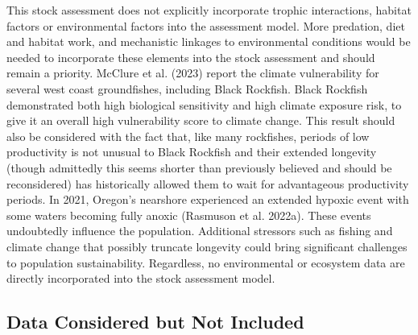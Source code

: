 \documentclass[11pt,
  english,
  letterpaper,
]{article}
\begin{document}
This stock assessment does not explicitly incorporate trophic interactions, habitat factors or environmental factors into the assessment model. More predation, diet and habitat work, and mechanistic linkages to environmental conditions would be needed to incorporate these elements into the stock assessment and should remain a priority. McClure et al. (2023) report the climate vulnerability for several west coast groundfishes, including Black Rockfish. Black Rockfish demonstrated both high biological sensitivity and high climate exposure risk, to give it an overall high vulnerability score to climate change. This result should also be considered with the fact that, like many rockfishes, periods of low productivity is not unusual to Black Rockfish and their extended longevity (though admittedly this seems shorter than previously believed and should be reconsidered) has historically allowed them to wait for advantageous productivity periods. In 2021, Oregon's nearshore experienced an extended hypoxic event with some waters becoming fully anoxic (Rasmuson et al. 2022a). These events undoubtedly influence the population. Additional stressors such as fishing and climate change that possibly truncate longevity could bring significant challenges to population sustainability. Regardless, no environmental or ecosystem data are directly incorporated into the stock assessment model.

\hypertarget{data-considered-but-not-included}{%
\subsection{Data Considered but Not Included}\label{data-considered-but-not-included}}
\end{document}
